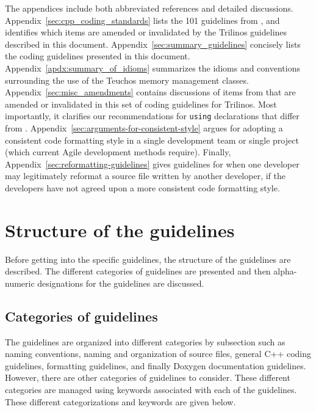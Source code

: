 The appendices include both abbreviated references and detailed
discussions.  Appendix~\ref{sec:cpp_coding_standards} lists the 101
guidelines from {}\cite{C++CodingStandards05}, and identifies which
items are amended or invalidated by the Trilinos guidelines described
in this document.  Appendix~\ref{sec:summary_guidelines} concisely
lists the coding guidelines presented in this document.
Appendix~\ref{apdx:summary_of_idioms} summarizes the idioms and
conventions surrounding the use of the Teuchos memory management
classes.  Appendix~\ref{sec:misc_amendments} contains discussions of
items from {}\cite{C++CodingStandards05} that are amended or
invalidated in this set of coding guidelines for Trilinos.  Most
importantly, it clarifies our recommendations for {}\texttt{using}
declarations that differ from {}\cite[Item 59]{C++CodingStandards05}.
Appendix~\ref{sec:arguments-for-consistent-style} argues for adopting
a consistent code formatting style in a single development team or
single project (which current Agile development methods require).
Finally, Appendix~\ref{sec:reformatting-guidelines} gives guidelines
for when one developer may legitimately reformat a source file written
by another developer, if the developers have not agreed upon a more
consistent code formatting style.


%
\section{Structure of the guidelines}
\label{sec:guideline_structure}
%

Before getting into the specific guidelines, the structure of the
guidelines are described.  The different categories of guidelines
are presented and then alpha-numeric designations for the guidelines
are discussed.


%
\subsection{Categories of guidelines}
%

The guidelines are organized into different categories by subsection
such as naming conventions, naming and organization of source files,
general C++ coding guidelines, formatting guidelines, and finally
Doxygen documentation guidelines.  However, there are other categories
of guidelines to consider.  These different categories are managed
using keywords associated with each of the guidelines.  These
different categorizations and keywords are given below.

